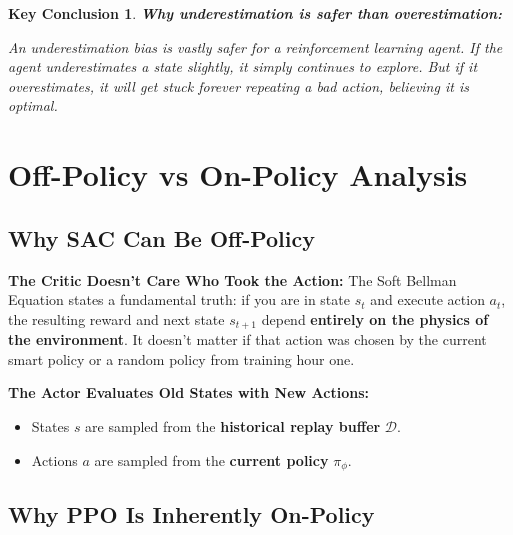 \documentclass[12pt,a4paper]{article}
\theoremstyle{noteplain}
\newtheorem{important}{Key Conclusion}[section]
\theoremstyle{noteexercise}
\begin{document}
\begin{important}
\textbf{Why underestimation is safer than overestimation:}

An underestimation bias is vastly safer for a reinforcement learning agent. If the agent underestimates a state slightly, it simply continues to explore. But if it overestimates, it will get stuck forever repeating a bad action, believing it is optimal.
\end{important}






\section{Off-Policy vs On-Policy Analysis}\label{sec:off-policy}



\subsection{Why SAC Can Be Off-Policy}\label{ssec:sac-offpolicy}



\textbf{The Critic Doesn't Care Who Took the Action:} The Soft Bellman Equation states a fundamental truth: if you are in state $s_t$ and execute action $a_t$, the resulting reward and next state $s_{t+1}$ depend \textbf{entirely on the physics of the environment}. It doesn't matter if that action was chosen by the current smart policy or a random policy from training hour one.

\textbf{The Actor Evaluates Old States with New Actions:}

\begin{itemize}
  \item States $s$ are sampled from the \textbf{historical replay buffer} $\mathcal{D}$.
  \item Actions $a$ are sampled from the \textbf{current policy} $\pi_\phi$.
\end{itemize}



\subsection{Why PPO Is Inherently On-Policy}\label{ssec:ppo-onpolicy}
\end{document}
